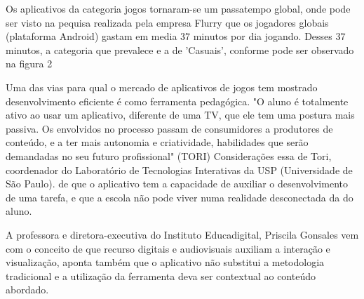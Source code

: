 	
Os aplicativos da categoria jogos tornaram-se um passatempo global, onde pode ser visto na pequisa  realizada pela empresa Flurry que os jogadores globais (plataforma Android) gastam em media 37 minutos por dia jogando. Desses 37 minutos, a categoria que prevalece e a de 'Casuais', conforme pode ser observado na figura 2\begin{figure}[h!]
		\centering
	\end{figure}
	

Uma das vias para qual o mercado de aplicativos de jogos tem mostrado desenvolvimento eficiente é como ferramenta pedagógica.
"O aluno é totalmente ativo ao usar um aplicativo, diferente de uma TV, que ele tem uma postura mais passiva. 
Os envolvidos no processo passam de consumidores a produtores de conteúdo, e a ter mais autonomia e criatividade, habilidades que serão demandadas no seu futuro profissional" (TORI)
Considerações essa de Tori, coordenador do Laboratório de Tecnologias Interativas da USP (Universidade de São Paulo).
de que o aplicativo tem a capacidade de auxiliar o desenvolvimento de uma tarefa, e que a escola não pode viver numa realidade desconectada da do aluno.

A professora e diretora-executiva do Instituto Educadigital, Priscila Gonsales vem com o conceito de que recurso digitais
e audiovisuais auxiliam a interação e visualização, aponta também que o aplicativo não substitui a metodologia tradicional e a utilização da ferramenta deva ser contextual ao conteúdo abordado.


